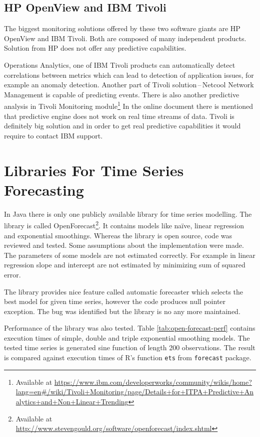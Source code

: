     \subsection{HP OpenView and IBM Tivoli}
    The biggest monitoring solutions offered by these two software giants are HP OpenView and IBM Tivoli. Both are
    composed of many independent products. Solution from HP does not offer any predictive capabilities.

    Operations Analytics, one of IBM Tivoli products can automatically detect correlations between
    metrics which can lead to detection of application issues, for example an anomaly detection. Another part of Tivoli
    solution\,--\,Netcool Network Management is capable of predicting events. There is also another predictive analysis
    in Tivoli Monitoring module\footnote{Available at \url{https://www.ibm.com/developerworks/community/wikis/home?lang=en\#/wiki/Tivoli+Monitoring/page/Details+for+ITPA+Predictive+Analytics+and+Non+Linear+Trending}}
    In the online document there is mentioned that predictive engine does not work on real time streams of data. Tivoli
    is definitely big solution and in order to get real predictive capabilities it would require to contact IBM
    support.

    \section{Libraries For Time Series Forecasting} \label{libraries-for-ts}
    In Java there is only one publicly available library for time series modelling. The library is called
    OpenForecast\footnote{Available at \url{http://www.stevengould.org/software/openforecast/index.shtml}}. It contains
    models like na\"{i}ve, linear regression and exponential smoothings. Whereas the library is open source, code
    was reviewed and tested. Some assumptions about the implementation were made. The parameters of some models are
    not estimated correctly. For example in linear regression slope and intercept are not estimated by minimizing
    sum of squared error.

    The library provides nice feature called automatic forecaster which selects the best model for given
    time series, however the code produces null pointer exception. The bug was identified but the library is no any more
    maintained.

    Performance of the library was also tested. Table \ref{tab:open-forecast-perf} contains execution times of
    simple, double and triple exponential smoothing models. The tested time series is generated sine function of
    length 200 observations. The result is compared against execution times of R's function \texttt{ets} from
    \texttt{forecast} package.

